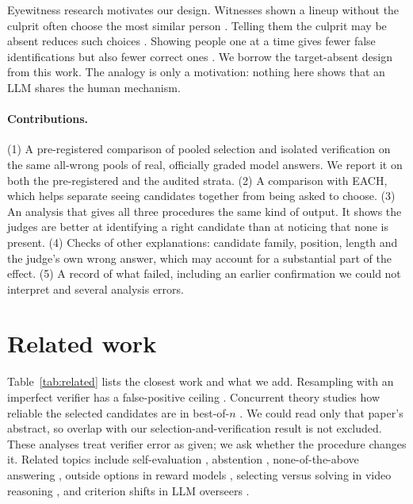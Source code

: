 \documentclass[10pt,twocolumn]{article}
\begin{document}
Eyewitness research motivates our design. Witnesses shown a lineup without the culprit often choose the most similar person \citep{wells1984psychology}. Telling them the culprit may be absent reduces such choices \citep{malpass1981eyewitness}. Showing people one at a time gives fewer false identifications but also fewer correct ones \citep{steblay2001eyewitness,steblay2011seventytwo}. We borrow the target-absent design from this work. The analogy is only a motivation: nothing here shows that an LLM shares the human mechanism.

\paragraph{Contributions.}
(1) A pre-registered comparison of pooled selection and isolated verification on the same all-wrong pools of real, officially graded model answers. We report it on both the pre-registered and the audited strata. (2) A comparison with EACH, which helps separate seeing candidates together from being asked to choose. (3) An analysis that gives all three procedures the same kind of output. It shows the judges are better at identifying a right candidate than at noticing that none is present. (4) Checks of other explanations: candidate family, position, length and the judge's own wrong answer, which may account for a substantial part of the effect. (5) A record of what failed, including an earlier confirmation we could not interpret and several analysis errors.

\section{Related work}
Table~\ref{tab:related} lists the closest work and what we add. Resampling with an imperfect verifier has a false-positive ceiling \citep{stroebl2026limits}. Concurrent theory studies how reliable the selected candidates are in best-of-$n$ \citep{zhang2026selected}. We could read only that paper's abstract, so overlap with our selection-and-verification result is not excluded. These analyses treat verifier error as given; we ask whether the procedure changes it. Related topics include self-evaluation \citep{kadavath2022language}, abstention \citep{wen2024know}, none-of-the-above answering \citep{tam2025none}, outside options in reward models \citep{rho2025best}, selecting versus solving in video reasoning \citep{ma2026selecting}, and criterion shifts in LLM overseers \citep{chen2026beyond}.
\end{document}

